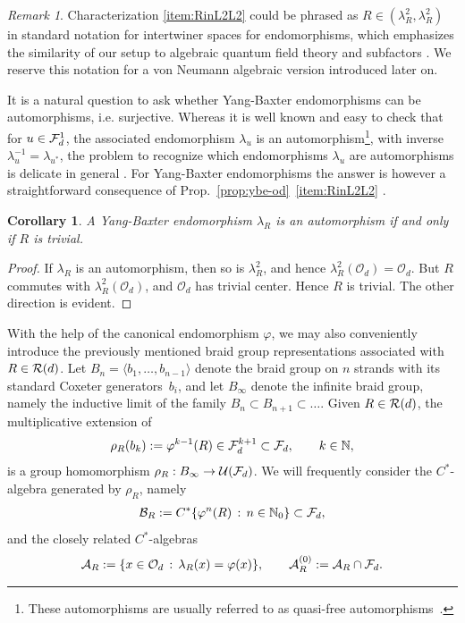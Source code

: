 \documentclass[12pt,a4paper]{amsart}
\numberwithin{equation}{section}
\newtheorem{corollary}[theorem]{Corollary}
\theoremstyle{remark}
\newtheorem{remark}[theorem]{Remark}
\newcommand{\Nl}{\mathbb{N}}
\newcommand{\la}{\lambda}
\newcommand{\CA}[0]{\mathcal{A}} \newcommand{\CB}[0]{\mathcal{B}}
\newcommand{\CO}[0]{\mathcal{O}} \newcommand{\CP}[0]{\mathcal{P}}
\newcommand{\CU}[0]{\mathcal{U}} \newcommand{\CV}[0]{\mathcal{V}}
\begin{document}
\begin{remark}
	Characterization \ref{item:RinL2L2} could be phrased as $R\in(\la_R^2,\la_R^2)$ in standard notation for intertwiner spaces for endomorphisms, which emphasizes the similarity of our setup to algebraic quantum field theory and subfactors \cite{DoplicherHaagRoberts:1971,Longo:1992,FredenhagenRehrenSchroer:1989}. We reserve this notation for a von Neumann algebraic version introduced later on.
\end{remark}

It is a natural question to ask whether Yang-Baxter endomorphisms can be automorphisms, i.e. surjective. Whereas it is well known and easy to check that for $u\in\mathcal{F}_d^1$, the associated endomorphism $\la_u$ is an automorphism\footnote{These automorphisms are usually referred to as quasi-free automorphisms~\cite{Evans:1980}.}, with inverse $\la_u^{-1}=\la_{u^*}$, the problem to recognize which endomorphisms $\la_u$ are automorphisms is delicate in general \cite{ContiSzymanski:2011}. For Yang-Baxter endomorphisms the answer is however a straightforward consequence of Prop.~\ref{prop:ybe-od}~\ref{item:RinL2L2} \cite{ContiHongSzymanski:2012}.

\begin{corollary}\label{cor:no-auto}
    A Yang-Baxter endomorphism $\la_R$ is an automorphism if and only if $R$ is trivial. 
\end{corollary}
\begin{proof}
    If $\la_R$ is an automorphism, then so is $\la_R^2$, and hence $\la_R^2(\CO_d)=\CO_d$. But $R$ commutes with $\la_R^2(\CO_d)$, and $\CO_d$ has trivial center. Hence $R$ is trivial. The other direction is evident.
\end{proof}

With the help of the canonical endomorphism $\varphi$, we may also conveniently introduce the previously mentioned braid group representations associated with $R\in\mathcal{R}(d)$. Let $B_n=\langle b_1,\ldots,b_{n-1}\rangle$ denote the braid group on $n$ strands with its standard Coxeter generators~$b_i$, and let $B_\infty$ denote the infinite braid group, namely the inductive limit of the family $B_n\subset B_{n+1}\subset\ldots$. Given $R\in\mathcal{R}(d)$, the multiplicative extension of 
\begin{align}
 \rho_R(b_k):=\varphi^{k-1}(R)\in\CF_d^{k+1}\subset\CF_d
 , \qquad k\in\Nl,
\end{align}
is a group homomorphism $\rho_R:B_\infty\to\CU(\CF_d)$. We will frequently consider the $C^*$-algebra generated by $\rho_R$, namely
\begin{align}\label{eq:BR}
 \CB_R
 :=
 C^*\{\varphi^n(R)\,:\,n\in\Nl_0\}
 \subset
 \CF_d,
\end{align}
and the closely related $C^*$-algebras
\begin{align}\label{eq:AR}
 \CA_R
 :=
 \{x\in\CO_d\,:\,\la_R(x)=\varphi(x)\}
 ,\qquad
 \CA_R^{(0)}
 :=
 \CA_R\cap\CF_d
 .
\end{align}
\end{document}
